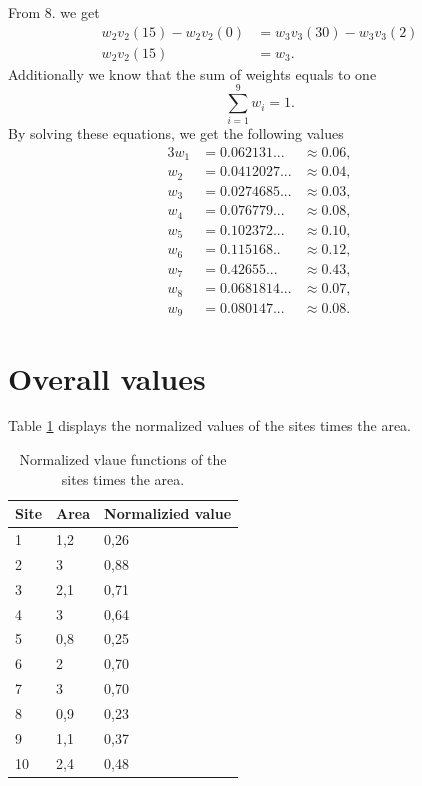 \documentclass{article}
\begin{document}
	From 8. we get
	\begin{align}
		w_2v_2(15)-w_2v_2(0) &= w_3v_3(30)-w_3v_3(2)\\
		w_2v_2(15) &= w_3.
	\end{align}
	Additionally we know that the sum of weights equals to one 
	\begin{equation}
		\sum_{i=1}^{9}w_i=1.
	\end{equation}
	By solving these equations, we get the following values
	\begin{alignat}{3}
		w_1&= 0.062131...& \approx 0.06,\\
		w_2&= 0.0412027...&\approx0.04,\\
		w_3&= 0.0274685...&\approx0.03,\\
		w_4&= 0.076779...&\approx0.08,\\
		w_5&= 0.102372...&\approx0.10,\\
		w_6&= 0.115168..&\approx0.12,\\
		w_7&= 0.42655...&\approx0.43,\\
		w_8&= 0.0681814...&\approx0.07,\\
		w_9&= 0.080147...&\approx0.08.
	\end{alignat}
\section{Overall values}
	Table \ref{tab:ex5} displays the normalized values of the sites times the area.
	\begin{table}[H]
		\centering
		\caption{Normalized vlaue functions of the sites times the area.}
		\label{tab:ex5}
		\begin{tabular}{lll}
			\textbf{Site} & \textbf{Area} & \textbf{Normalizied value} \\ \hline
			1             & 1,2           & 0,26                       \\
			2             & 3             & 0,88                       \\
			3             & 2,1           & 0,71                       \\
			4             & 3             & 0,64                       \\
			5             & 0,8           & 0,25                       \\
			6             & 2             & 0,70                       \\
			7             & 3             & 0,70                       \\
			8             & 0,9           & 0,23                       \\
			9             & 1,1           & 0,37                       \\
			10            & 2,4           & 0,48                      
		\end{tabular}
	\end{table}
\end{document}
